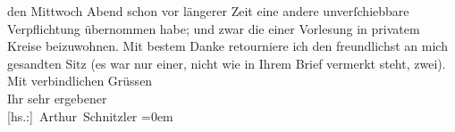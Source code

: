 \begin{ledgroupsized}[t]{13cm}
               den Mittwoch{ }Abend schon vor längerer Zeit eine andere \introOben{}unverſchiebbare\introOben{} Verpflichtung übernommen habe\introOben{};\introOben{}
               und zwar die einer Vorlesung in privatem Kreise beizuwohnen.\pend
           \pstart
           {\pb}Mit bestem Danke retourniere ich den freundlichst
               an mich gesandten Sitz (es war nur einer, nicht wie in Ihrem Brief vermerkt steht,
               zwei).\pend
           \pstart
           Mit verbindlichen Grüssen{\\[\baselineskip]}Ihr sehr ergebener{\\[\baselineskip]}\spacefill\mbox{{[}hs.:{]} Arthur Schnitzler}\pend
           \leftskip=0em{}\endnumbering{}\end{ledgroupsized}  \newcommand{\dateiname}{L02322}\newcommand{\titel}{Arthur Schnitzler an Georg Engländer, 3. 3. 1919}\newcommand{\editorInnen}{Martin Anton Müller und Gerd-Hermann Susen}
      